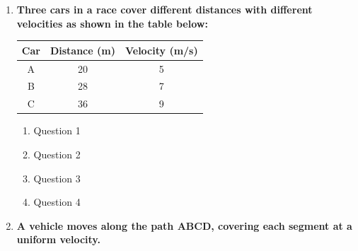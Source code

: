 \documentclass[a4paper,oneside]{book}
\begin{document}
\begin{enumerate}

\item
\textbf{Three cars in a race cover different distances with different velocities as shown in the table below:}

\begin{table}[h]
\centering
\begin{tabular}{|c|c|c|}
\hline
\textbf{Car} & \textbf{Distance (m)} & \textbf{Velocity (m/s)} \\
\hline
A & 20 & 5 \\
\hline
B & 28 & 7 \\
\hline
C & 36 & 9 \\
\hline
\end{tabular}
\end{table}
  \begin{enumerate}
    \item
	Question \hfill 1
    \item
	Question \hfill 2
    \item  
	Question \hfill 3
    \item
	Question \hfill 4
  \end{enumerate}

 \item
  \textbf{A vehicle moves along the path ABCD, covering each segment at a uniform velocity.}

\begin{center}

\end{center}
\end{enumerate}
\end{document}
